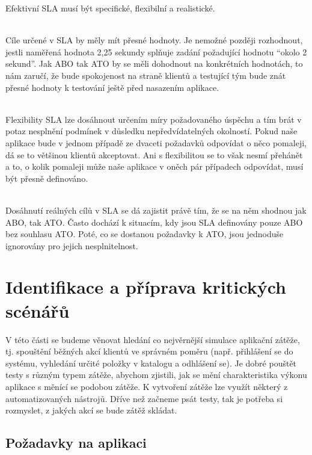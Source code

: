 \documentclass[122pt,oneside]{fithesis}
\begin{document}
Efektivní SLA musí být specifické, flexibilní a realistické.

\vspace{5 mm}
\\\indent Cíle určené v SLA by měly mít přesné hodnoty. Je nemožné později rozhodnout, jestli naměřená hodnota 2,25 sekundy splňuje zadání požadující hodnotu “okolo 2 sekund”. Jak ABO tak ATO by se měli dohodnout na konkrétních hodnotách, to nám zaručí, že bude spokojenost na straně klientů a testující tým bude znát přesné hodnoty k testování ještě před nasazením aplikace.

\vspace{5 mm}
\\\indent Flexibility SLA lze dosáhnout určením míry požadovaného úspěchu a tím brát v potaz nesplnění podmínek v důsledku nepředvídatelných okolností. Pokud naše aplikace bude v jednom případě ze dvaceti požadavků odpovídat o něco pomaleji, dá se to většinou klientů akceptovat. Ani s flexibilitou se to však nesmí přehánět a to, o kolik pomaleji může naše aplikace v oněch pár případech odpovídat, musí být přesně definováno.

\vspace{5 mm}
\\\indent Dosáhnutí reálných cílů v SLA se dá zajistit právě tím, že se na něm shodnou jak ABO, tak ATO. Často dochází k situacím, kdy jsou SLA definovány pouze ABO bez souhlasu ATO. Poté, co se dostanou požadavky k ATO, jsou jednoduše ignorovány pro jejich nesplnitelnost.


\section{Identifikace a příprava kritických scénářů}
V této části se budeme věnovat hledání co nejvěrnější simulace aplikační zátěže, tj. spouštění běžných akcí klientů ve správném poměru (např. přihlášení se do systému, vyhledání určité položky v katalogu a odhlášení se). Je dobré pouštět testy s různým typem zátěže, abychom zjistili, jak se mění charakteristika výkonu aplikace s měnící se podobou zátěže. K vytvoření zátěže lze využít některý z automatizovaných nástrojů. Dříve než začneme psát testy, tak je potřeba si rozmyslet, z jakých akcí se bude zátěž skládat.

\subsection{Požadavky na aplikaci}
\end{document}
